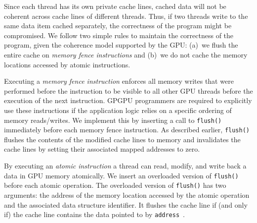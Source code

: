 Since each thread has its own private cache lines, cached data will not be coherent across
cache lines of different threads. 
Thus, if two threads write to the same data item cached separately, the correctness of the program might be compromised.
We follow two simple rules to maintain the correctness of the program, given the coherence model supported by the GPU:
(a)~we flush the entire cache on {\it memory fence instructions} and (b)~we do not cache the memory locations accessed by {atomic instructions}. 

Executing a {\it memory fence instruction} enforces all memory writes that were performed before the instruction to be visible to all other GPU threads before the execution of the next instruction. 
GPGPU programmers  are required to explicitly use these instructions if the application logic relies on a specific ordering of memory reads/writes. 
We implement this by inserting a call to \texttt{flush()} immediately before each memory fence instruction. 
As described earlier, \texttt{flush()}  flushes the contents of the modified cache lines to memory and invalidates the cache lines by setting their associated mapped addresses to zero.

By executing an {\it atomic instruction} a thread can read, modify, and write back a data in GPU memory atomically.
We insert an overloaded version of \texttt{flush()} before each atomic operation.
The overloaded version of \texttt{flush()} has two arguments: the address of the memory location accessed by the atomic operation and the associated data structure identifier.
It flushes the cache line if (and only if) the cache line contains the data pointed to by \texttt{address}~\cite{jia2012characterizing}.



